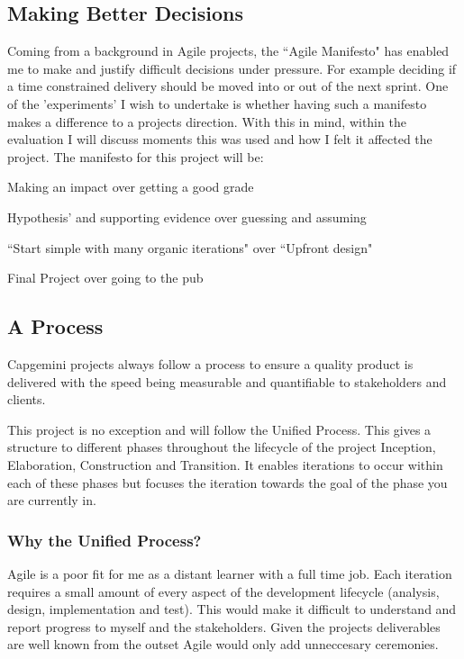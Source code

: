 \subsection{Making Better Decisions}
Coming from a background in Agile projects, the ``Agile Manifesto" \citep{AgileManifesto} has
enabled
me to make and justify difficult decisions under pressure. For example deciding
 if a time constrained delivery should be moved into or out of the next
 sprint. One of the 'experiments' I wish to undertake is whether having such a
 manifesto makes a difference to a projects direction. With this in mind,
 within the evaluation I will discuss moments this was used and how I felt
 it affected the project. The manifesto for this project will be:

\begin{center}
Making an impact over getting a good grade

Hypothesis’ and supporting evidence over guessing and assuming

``Start simple with many organic iterations" over ``Upfront design"

Final Project over going to the pub
\end{center}

\subsection{A Process}
Capgemini projects always follow a process \citep{CapgeminiSustain} to ensure a
quality
product is delivered with the speed being measurable and quantifiable to
stakeholders and clients.

This project is no exception and will follow the Unified Process. This gives
a structure to different phases throughout the lifecycle of
the project Inception, Elaboration, Construction and Transition. It enables
iterations to occur within each of these phases but focuses the iteration
towards the goal of the phase you are currently in.

\subsubsection{Why the Unified Process?}

Agile is a poor fit for me as a distant learner with a
full time job. Each iteration requires a small amount of every aspect of the
development lifecycle (analysis, design, implementation and test). This would
make it difficult to understand and report progress to myself and the
stakeholders. Given the projects deliverables are well known from
the outset Agile would only add unneccesary ceremonies.

